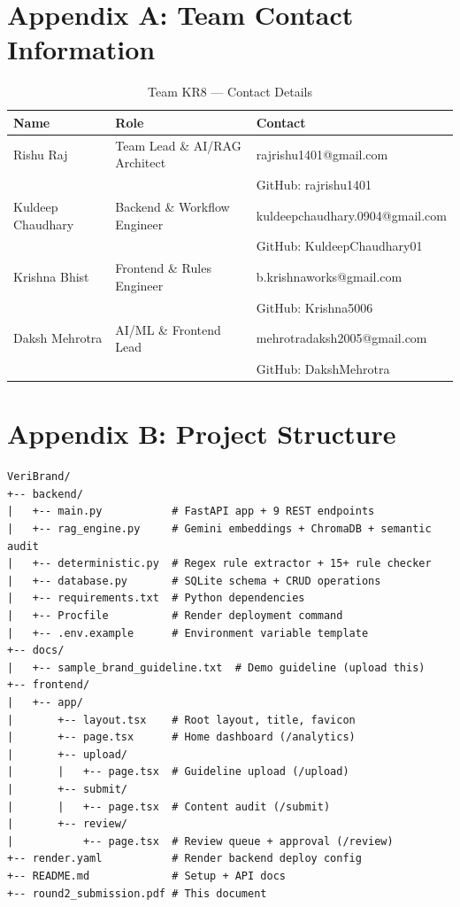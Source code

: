 \documentclass[11pt,a4paper]{article}
\begin{document}
\newpage

\section*{Appendix A: Team Contact Information}

\begin{table}[H]
\centering
\begin{tabular}{p{} p{} p{}}
\toprule
\textbf{Name} & \textbf{Role} & \textbf{Contact} \\
\midrule
Rishu Raj & Team Lead \& AI/RAG Architect & rajrishu1401@gmail.com \\
 & & GitHub: rajrishu1401 \\
\addlinespace
Kuldeep Chaudhary & Backend \& Workflow Engineer & kuldeepchaudhary.0904@gmail.com \\
 & & GitHub: KuldeepChaudhary01 \\
\addlinespace
Krishna Bhist & Frontend \& Rules Engineer & b.krishnaworks@gmail.com \\
 & & GitHub: Krishna5006 \\
\addlinespace
Daksh Mehrotra & AI/ML \& Frontend Lead & mehrotradaksh2005@gmail.com \\
 & & GitHub: DakshMehrotra \\
\bottomrule
\end{tabular}
\caption{Team KR8 --- Contact Details}
\end{table}

\section*{Appendix B: Project Structure}

\begin{verbatim}
VeriBrand/
+-- backend/
|   +-- main.py           # FastAPI app + 9 REST endpoints
|   +-- rag_engine.py     # Gemini embeddings + ChromaDB + semantic audit
|   +-- deterministic.py  # Regex rule extractor + 15+ rule checker
|   +-- database.py       # SQLite schema + CRUD operations
|   +-- requirements.txt  # Python dependencies
|   +-- Procfile          # Render deployment command
|   +-- .env.example      # Environment variable template
+-- docs/
|   +-- sample_brand_guideline.txt  # Demo guideline (upload this)
+-- frontend/
|   +-- app/
|       +-- layout.tsx    # Root layout, title, favicon
|       +-- page.tsx      # Home dashboard (/analytics)
|       +-- upload/
|       |   +-- page.tsx  # Guideline upload (/upload)
|       +-- submit/
|       |   +-- page.tsx  # Content audit (/submit)
|       +-- review/
|           +-- page.tsx  # Review queue + approval (/review)
+-- render.yaml           # Render backend deploy config
+-- README.md             # Setup + API docs
+-- round2_submission.pdf # This document
\end{verbatim}
\end{document}
